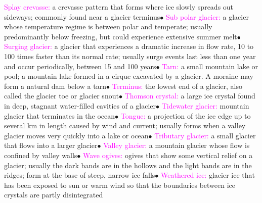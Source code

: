 \documentclass{article}
\newcommand{\ddd}{$\bullet$}
\newcommand{\pink}[1]{\textcolor{magenta}{#1}}
\newcommand{\vocab}[1]{{\pink{#1}}}
\begin{document}
\begin{multicols*}{4}
		\vocab{        Splay crevasse: } a crevasse pattern that forms where ice slowly spreads out sideways; commonly found near a glacier terminus\ddd
		\vocab{        Sub polar glacier: } a glacier whose temperature regime is between polar and temperate; usually predominantly below freezing, but could experience extensive summer melt\ddd
		\vocab{        Surging glacier: } a glacier that experiences a dramatic increase in flow rate, 10 to 100 times faster than its normal rate; usually surge events last less than one year and occur periodically, between 15 and 100 years\ddd
		\vocab{        Tarn: } a small mountain lake or pool; a mountain lake formed in a cirque excavated by a glacier. A moraine may form a natural dam below a tarn\ddd
		\vocab{        Terminus: } the lowest end of a glacier, also called the glacier toe or glacier snout\ddd
		\vocab{        Thomson crystal: } a large ice crystal found in deep, stagnant water-filled cavities of a glacier\ddd
		\vocab{        Tidewater glacier: } mountain glacier that terminates in the ocean\ddd
		\vocab{        Tongue: } a projection of the ice edge up to several km in length caused by wind and current; usually forms when a valley glacier moves very quickly into a lake or ocean\ddd
		\vocab{        Tributary glacier: } a small glacier that flows into a larger glacier\ddd
		\vocab{        Valley glacier: } a mountain glacier whose flow is confined by valley walls\ddd
		\vocab{        Wave ogives: } ogives that show some vertical relief on a glacier; usually the dark bands are in the hollows and the light bands are in the ridges; form at the base of steep, narrow ice falls\ddd
		\vocab{        Weathered ice: } glacier ice that has been exposed to sun or warm wind so that the boundaries between ice crystals are partly disintegrated

	   	
	\end{multicols*}
\end{document}
